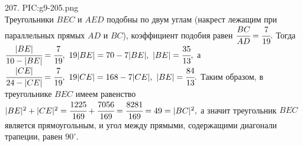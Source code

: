 207. {{PIC:g9-205.png}}\\
Треугольники $BEC$ и $AED$ подобны по двум углам (накрест лежащим при параллельных прямых $AD$ и $BC$), коэффициент подобия равен $\cfrac{BC}{AD}=
\cfrac{7}{19}.$ Тогда $\cfrac{|BE|}{10-|BE|}=\cfrac{7}{19},\ 19|BE|=70-7|BE|,\ |BE|=\cfrac{35}{13},$ а $\cfrac{|CE|}{24-|CE|}=\cfrac{7}{19},\ 19|CE|=168-7|CE|,\ |BE|=\cfrac{84}{13}.$ Таким образом, в треугольнике $BEC$ имеем равенство $|BE|^2+|CE|^2=\cfrac{1225}{169}+\cfrac{7056}{169}=\cfrac{8281}{169}=49=|BC|^2,$ а значит треугольник $BEC$ является прямоугольным, и угол между прямыми, содержащими диагонали трапеции, равен $90^\circ.$\\
